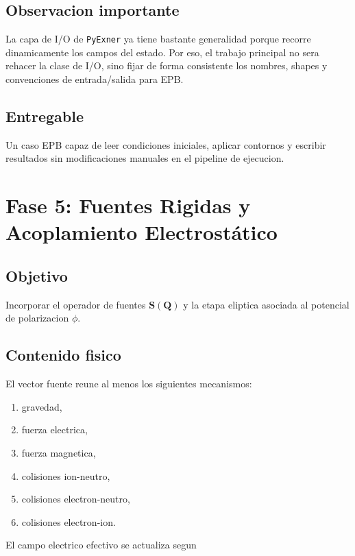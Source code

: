 \documentclass[11pt]{article}
\begin{document}
\subsection*{Observacion importante}

La capa de I/O de \texttt{PyExner} ya tiene bastante generalidad porque recorre dinamicamente los campos del estado. Por eso, el trabajo principal no sera rehacer la clase de I/O, sino fijar de forma consistente los nombres, shapes y convenciones de entrada/salida para EPB.

\subsection*{Entregable}

Un caso EPB capaz de leer condiciones iniciales, aplicar contornos y escribir resultados sin modificaciones manuales en el pipeline de ejecucion.

\section{Fase 5: Fuentes Rigidas y Acoplamiento Electrost\'atico}

\subsection*{Objetivo}

Incorporar el operador de fuentes $\mathbf{S}(\mathbf{Q})$ y la etapa eliptica asociada al potencial de polarizacion $\phi$.

\subsection*{Contenido fisico}

El vector fuente reune al menos los siguientes mecanismos:

\begin{enumerate}[label=\arabic*.]
    \item gravedad,
    \item fuerza electrica,
    \item fuerza magnetica,
    \item colisiones ion-neutro,
    \item colisiones electron-neutro,
    \item colisiones electron-ion.
\end{enumerate}

El campo electrico efectivo se actualiza segun
\end{document}
